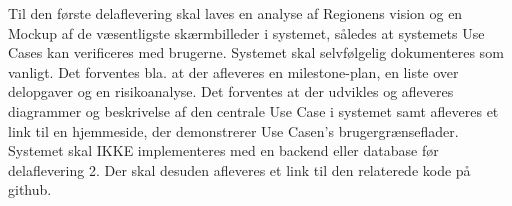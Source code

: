 
Til den første delaflevering skal laves en analyse af Regionens vision og en Mockup af de væsentligste skærmbilleder i systemet, således at systemets Use Cases kan verificeres med brugerne. 
Systemet skal selvfølgelig dokumenteres som vanligt. Det forventes bla. at der afleveres en milestone-plan, en liste over delopgaver og en risikoanalyse.
Det forventes at der udvikles og afleveres diagrammer og beskrivelse af den centrale Use Case i systemet samt afleveres et link til en hjemmeside, der demonstrerer Use Casen's brugergrænseflader. 
Systemet skal IKKE implementeres med en backend eller database før delaflevering 2. Der skal desuden afleveres et link til den relaterede kode på github. 
